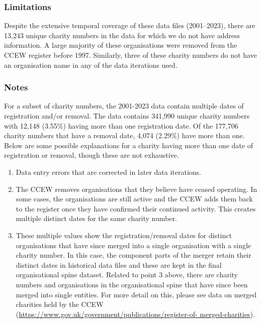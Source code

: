 \documentclass{article}
\begin{document}
\subsubsection{Limitations }
Despite the extensive temporal coverage of these data files (2001–2023), there are 13,243
unique charity numbers in the data for which we do not have address information. A large
majority of these organisations were removed from the CCEW register before 1997. Similarly,
three of these charity numbers do not have an organisation name in any of the data iterations
used. 
\subsubsection{Notes}
For   a   subset   of   charity   numbers,   the 2001-2023  data   contain   multiple   dates   of   registration   and/or
removal. The data contains 341,990 unique charity numbers with 12,148 (3.55\%) having more
than one registration date. Of the 177,706 charity numbers that have a removal date, 4,074
(2.29\%) have more than one. 
Below are some possible explanations for a charity having more than one date of registration or
removal, though these are not exhaustive. 
\begin{enumerate}
  \item Data entry errors that are corrected in later data iterations.
\item The CCEW removes organisations that they believe have ceased operating. In some
cases, the organisations are still active and the CCEW adds them back to the register
once they have confirmed their continued activity. This creates multiple distinct dates
for the same charity number. 
\item These multiple values show the registration/removal dates for distinct organisations that
have since merged into a single organisation with a single charity number. In this case,
the component parts of the merger retain their distinct dates in historical data files and
these are kept in the final organisational spine dataset. 
Related to point 3 above, there are charity numbers and organisations in the organisational spine
that have since been merged into single entities. For more detail on this, please see data on
merged charities held by the CCEW (\url{https://www.gov.uk/government/publications/register-of-
merged-charities}). 
\end{enumerate}
\end{document}
